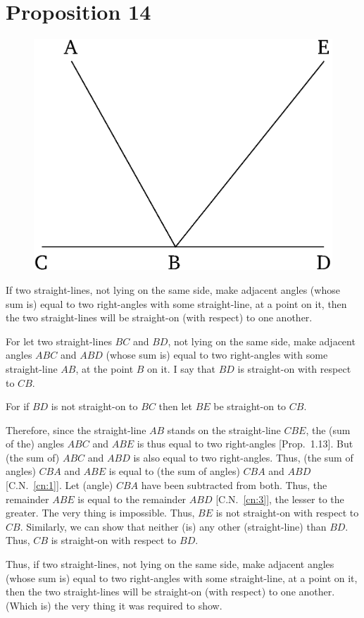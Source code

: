 \chapter*{Proposition 14}
\label{prop:14}

\begin{figure}[ht]
    \begin{center}
    \includegraphics[width=0.5\linewidth]{figures/fig14e.eps}
    \label{fig:prop_14}
    \end{center}
\end{figure}

If two straight-lines, not lying on the same side,  make adjacent angles (whose sum is) equal to two right-angles  with some straight-line, at a point on it, then the two straight-lines
will be straight-on (with respect) to one another.

For let two
straight-lines $BC$ and $BD$, not lying on the same side,  make adjacent angles $ABC$ and $ABD$ (whose sum is)
equal to two right-angles with some straight-line $AB$, at the point $B$ on it. I say
that $BD$ is  straight-on with respect to $CB$.

For if $BD$ is not straight-on to $BC$ then let $BE$ be straight-on to $CB$.

Therefore, since the straight-line $AB$ stands on the straight-line $CBE$, the (sum of the) angles $ABC$ and $ABE$ is thus equal to two right-angles [Prop.~1.13]. But (the sum of) $ABC$ and $ABD$ is also equal to two right-angles.
Thus, 
(the sum of angles) $CBA$ and $ABE$ is equal to (the sum of angles) $CBA$ and $ABD$ [C.N.~\ref{cn:1}]. Let (angle)
$CBA$ have been subtracted from both. Thus, the remainder $ABE$ is
equal to the remainder $ABD$ [C.N.~\ref{cn:3}], the lesser to the greater. The very thing is impossible. Thus, $BE$ is not straight-on with respect to $CB$. Similarly, we can
show that neither (is) any other (straight-line)   than $BD$.
Thus, $CB$ is straight-on with respect to $BD$.

Thus, if two straight-lines, not lying on the same side,  make adjacent angles (whose sum is) equal to two right-angles with some straight-line, at a point on it, then the two straight-lines
will be straight-on (with respect) to one another. (Which is) the very thing it
was required to show.



